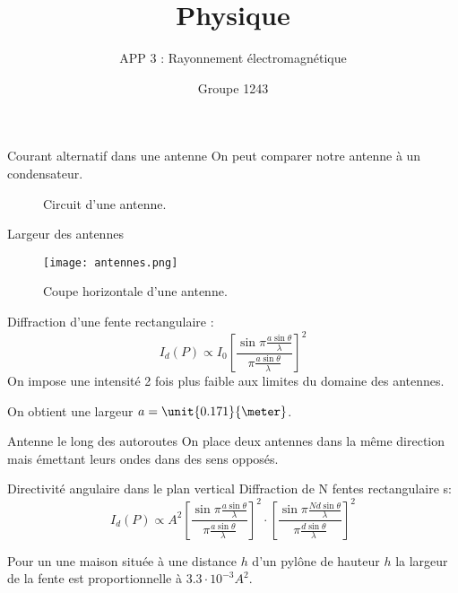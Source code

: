 \documentclass[pdf]{beamer}
\title{Physique}
\subtitle{APP 3 : Rayonnement électromagnétique}
\author{Groupe 1243}
\begin{document}
 

\begin{frame} 
	\titlepage 
\end{frame} 
  
\begin{frame}{Courant alternatif dans une antenne}
	On peut comparer notre antenne à un condensateur.

	\begin{figure}[htb!] 
		\centering
		\begin{subfigure}
			\texttt{[image: circuit-antenne.png]}
		\end{subfigure}
		\begin{subfigure}
			\texttt{[image: circuit-antenne-2.png]}
		\end{subfigure}
		\caption{Circuit d'une antenne.}
	\end{figure}
\end{frame}

\begin{frame}{Largeur des antennes}
	\begin{figure}[ht!] 
		\centering  
		\texttt{[image: antennes.png]}  
		\caption{Coupe horizontale d'une antenne.}  
	\end{figure}  
 	
	Diffraction d'une fente rectangulaire :
	$$I_d (P) \propto I_0 \left[\frac{\sin\pi\frac{a\sin\theta}{\lambda}}{\pi\frac{a\sin\theta}{\lambda}}\right]^2$$
	On impose une intensité 2 fois plus faible aux limites du domaine des antennes.

	On obtient une largeur $a = \unit{0.171}{\meter}$.
\end{frame}

\begin{frame}{Antenne le long des autoroutes}
	On place deux antennes dans la même direction mais émettant leurs ondes dans des sens opposés.
\end{frame}

\begin{frame}{Directivité angulaire dans le plan vertical}
	Diffraction de N fentes rectangulaire s:
	$$I_d (P)\propto A^2 \left[\frac{\sin \pi \frac{a \sin \theta}{\lambda}}{\pi \frac{a \sin \theta}{\lambda}}\right]^2  
	\cdot \left[  \frac{\sin \pi \frac{N d \sin \theta}{\lambda}}{\pi \frac{d \sin \theta}{\lambda}}\right]^2$$

	Pour un une maison située à une distance $h$ d'un pylône de hauteur $h$ la largeur de la fente est proportionnelle à $3.3 \cdot 10^{-3}A^2$.
\end{frame}
\end{document}
